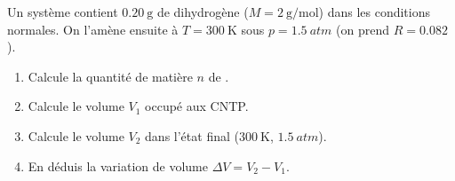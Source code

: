 \documentclass[11pt,a4paper]{article}
\begin{document}
\begin{exo}
Un système contient $\qty{0.20}{\gram}$ de dihydrogène  ($M=\qty{2}{\gram\per\mole}$) dans les
conditions normales. On l'amène ensuite à $T=\qty{300}{\kelvin}$ sous $p=\qty{1.5}{atm}$ (on prend
$R=\num{0,082}$).
\begin{enumerate}[label=\alph*)]
  \item Calcule la quantité de matière $n$ de .
  \item Calcule le volume $V_1$ occupé aux CNTP.
  \item Calcule le volume $V_2$ dans l'état final ($\qty{300}{\kelvin}$, $\qty{1.5}{atm}$).
  \item En déduis la variation de volume $\Delta V=V_2-V_1$.
\end{enumerate}
\end{exo}
\end{document}
